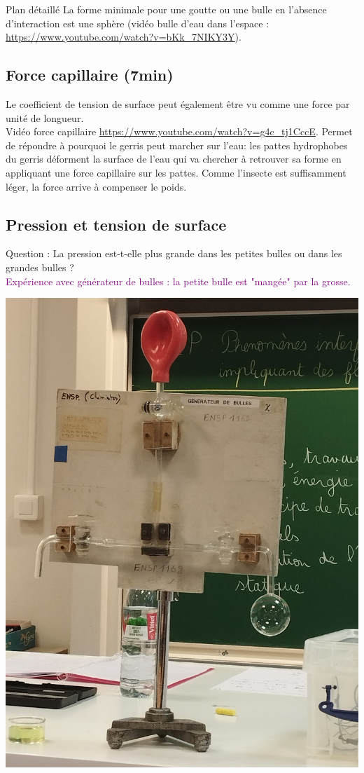 \begin{reportBlock}{Plan détaillé}
  La forme minimale pour une goutte ou une bulle en l'absence d'interaction est une sphère (vidéo bulle d'eau dans l'espace : \url{https://www.youtube.com/watch?v=bKk_7NIKY3Y}). 
  
  \subsection{Force capillaire (7min)}
  Le coefficient de tension de surface peut également être vu comme une force par unité de longueur. \\
  Vidéo force capillaire \url{https://www.youtube.com/watch?v=g4c_tj1CccE}.
  Permet de répondre à pourquoi le gerris peut marcher sur l'eau: les pattes hydrophobes du gerris déforment la surface de l'eau qui va chercher à retrouver sa forme en appliquant une force capillaire sur les pattes. Comme l'insecte est suffisamment léger, la force arrive à compenser le poids. 
  
 \subsection{Pression et tension de surface}
 Question : La pression est-t-elle plus grande dans les petites bulles ou dans les grandes bulles ? \\
 \textcolor{purple}{Expérience avec générateur de bulles : la petite bulle est "mangée" par la grosse.}
 \begin{center}
     \includegraphics[scale=0.1]{LP_TensionSurface/Manip_Laplace.jpg}
     

\end{center}
\end{reportBlock}
